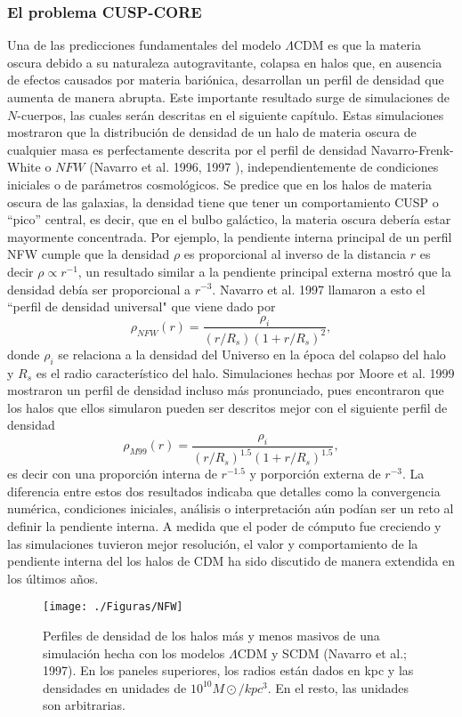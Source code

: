 \documentclass[a4paper,openright,12pt]{book}
\begin{document}
\subsubsection*{El problema CUSP-CORE} 
Una de las predicciones fundamentales del modelo $\Lambda$CDM es que la materia oscura debido a su naturaleza autogravitante, colapsa en halos que, en ausencia de efectos causados por materia bariónica, desarrollan un perfil de densidad que aumenta de manera abrupta. Este importante resultado surge de simulaciones de $N$-cuerpos, las cuales serán descritas en el siguiente capítulo. Estas simulaciones mostraron que la distribución de densidad de un halo de materia oscura de cualquier masa es perfectamente descrita por el perfil de densidad Navarro-Frenk-White o $NFW$ (Navarro et al. 1996, 1997 \cite{b1}), independientemente de condiciones iniciales o de parámetros cosmológicos. Se predice que en los halos de materia oscura de las galaxias, la densidad tiene que tener un comportamiento CUSP o ``pico'' central, es decir, que en el bulbo galáctico, la materia oscura debería estar mayormente concentrada. Por ejemplo, la pendiente interna principal de un perfil NFW cumple que la densidad $\rho$ es proporcional al inverso de la distancia $r$ es decir $\rho \propto r^{-1}$, un resultado similar a la pendiente principal externa mostró que la densidad debía ser proporcional a $r^{-3}$. Navarro et al. 1997 \cite{b1} llamaron a esto el ``perfil de densidad universal"  que viene dado por
\begin{equation}
\rho_{NFW}(r)= \frac{\rho_{i}}{(r/R_{s})(1 + r/R_{s})^{2}},\label{eqn 1.44}
\end{equation}
donde $\rho_{i}$ se relaciona a la densidad del Universo en la época del colapso del halo y $R_{s}$ es el radio característico del halo. Simulaciones hechas por Moore et al. 1999 \cite{Moore 1999} mostraron un perfil de densidad incluso más pronunciado, pues encontraron que los halos que ellos simularon pueden ser descritos mejor con el siguiente perfil de densidad
\begin{equation}
\rho_{M99}(r)= \frac{\rho_{i}}{(r/R_{s})^{1.5}(1 + r/R_{s})^{1.5}},\label{eqn 1.45}
\end{equation} 
es decir con una proporción interna de $r^{-1.5}$ y porporción externa de $r^{-3}$. La diferencia entre estos dos resultados indicaba que detalles como la convergencia numérica, condiciones iniciales, análisis o interpretación aún podían ser un reto al definir la pendiente interna. A medida que el poder de cómputo fue creciendo y las simulaciones tuvieron mejor resolución, el valor y comportamiento de la pendiente interna del los halos de CDM ha sido discutido de manera extendida en los últimos años.
\begin{figure}
\centering
  \texttt{[image: ./Figuras/NFW]}
  \caption{\footnotesize{Perfiles de densidad de los halos más y menos masivos de una simulación hecha con los modelos $\Lambda$CDM y SCDM (Navarro et al.; 1997). En los paneles superiores, los radios están dados en kpc y las densidades en unidades de $10^{10} M\odot / kpc^{3}$. En el resto, las unidades son arbitrarias.}}
  \label{fig 1.7}
\end{figure}
  
\end{document}
